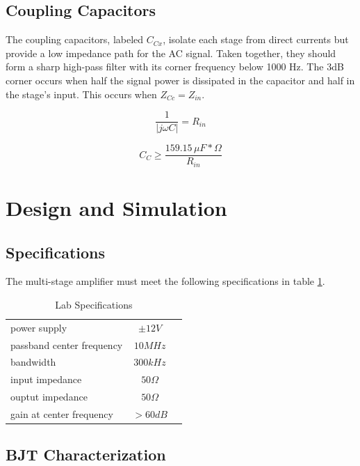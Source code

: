 \documentclass[titlepage, letterpaper, 11pt]{article}
\begin{document}
\subsection{Coupling Capacitors}

The coupling capacitors, labeled $C_{Cx}$, isolate each stage from
direct currents but provide a low impedance path for the AC signal.
Taken together, they should form a sharp high-pass filter with its
corner frequency below 1000 Hz. The 3dB corner occurs when half the
signal power is dissipated in the capacitor and half in the stage's
input. This occurs when $Z_{Cc}=Z_{in}$.

\begin{equation*}
\frac{1}{|j\omega C|}=R_{in}
\end{equation*}

\begin{equation}
C_{C}\geq \frac{159.15\,\mu F*\Omega}{R_{in}}
\label{couplingCapacitors}
\end{equation}

\section{Design and Simulation}

\subsection{Specifications}

The multi-stage amplifier must meet the following specifications in
table \ref{labSpecs}.

\begin{table}[ht]
\centering
\caption{Lab Specifications}
\begin{tabular}{l c c}
\hline
power supply			&$\pm 12V$	\\
passband center frequency	&$10MHz$	\\
bandwidth			&$300kHz$	\\
input impedance			&$50\Omega$	\\
ouptut impedance		&$50\Omega$	\\
gain at center frequency	&$>60dB$	\\
\hline
\end{tabular}
\label{labSpecs}
\end{table}

\subsection{BJT Characterization}
\end{document}
